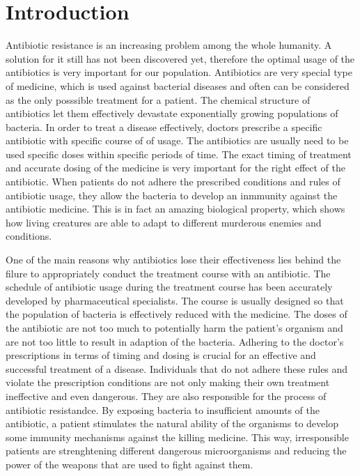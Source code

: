 \chapter*{Introduction}


Antibiotic resistance is an increasing problem among the whole humanity. A solution for it still has not been discovered yet, therefore the optimal usage of the antibiotics is very important for our population. Antibiotics are very special type of medicine, which is used against bacterial diseases and often can be considered as the only posssible treatment for a patient. The chemical structure of antibiotics let them effectively devastate exponentially growing populations of bacteria. In order to treat a disease effectively, doctors prescribe a specific antibiotic with specific course of of usage. The antibiotics are usually need to be used specific doses within specific periods of time. The exact timing of treatment and accurate dosing of the medicine is very important for the right effect of the antibiotic. When patients do not adhere the prescribed conditions and rules of antibiotic usage, they allow the bacteria to develop an inmmunity against the antibiotic medicine. This is in fact an amazing biological property, which shows how living creatures are able to adapt to different murderous enemies and conditions.

One of the main reasons why antibiotics lose their effectiveness lies behind the filure to appropriately conduct the treatment course with an antibiotic. The schedule of antibiotic usage during the treatment course has been accurately developed by pharmaceutical specialists. The course is usually designed so that the population of bacteria is effectively reduced with the medicine. The doses of the antibiotic are not too much to potentially harm the patient's organism and are not too little to result in adaption of the bacteria. Adhering to the doctor's prescriptions in terms of timing and dosing is crucial for an effective and successful treatment of a disease. Individuals that do not adhere these rules and violate the prescription conditions are not only making their own treatment ineffective and even dangerous. They are also responsible for the process of antibiotic resistandce. By exposing bacteria to insufficient amounts of the antibiotic, a patient stimulates the natural ability of the organisms to develop some immunity mechanisms against the killing medicine. This way, irresponsible patients are strenghtening different dangerous microorganisms and reducing the power of the weapons that are used to fight against them.


